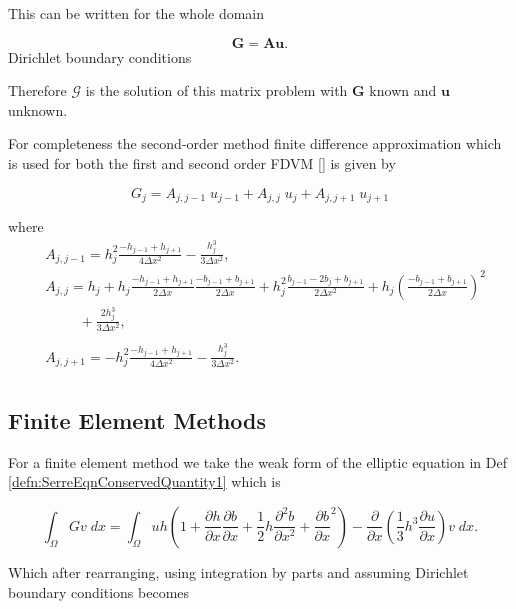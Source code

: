 This can be written for the whole domain 

\begin{equation*}
\boldsymbol{G} = \boldsymbol{A}
\boldsymbol{u}.
\end{equation*}
Dirichlet boundary conditions

Therefore $\mathcal{G}$ is the solution of this matrix problem with $\boldsymbol{G}$ known and $\boldsymbol{u}$ unknown. 

For completeness the second-order method finite difference approximation which is used for both the first and second order FDVM [] is given by

\begin{equation*}
G_j = A_{j,j-1} \; u_{j-1} + A_{j,j} \; u_{j} +  A_{j,j + 1} \;u_{j+1}
\end{equation*}

where 
\begin{align*}
&A_{j,j-1} = h^2_j\frac{-h_{j-1} + h_{j+1}}{4 \Delta x ^2} - \frac{h_{j}^3}{3 \Delta x ^2}, \\
&A_{j,j} = h_j + h_j \frac{-h_{j-1} + h_{j+1}}{2 \Delta x}\frac{-b_{j-1} + b_{j+1}}{2 \Delta x} + h_j^2\frac{b_{j-1} - 2b_j + b_{j+1}}{2 \Delta x^2} + h_j \left(\frac{-b_{j-1} + b_{j+1}}{2 \Delta x}\right)^2 \\
& \hspace{1cm}+ \frac{2 h_j^3}{3 \Delta x^2}, \\ \\
&A_{j,j+1} = -h^2_j\frac{-h_{j-1} + h_{j+1}}{4 \Delta x ^2} - \frac{h_{j}^3}{3 \Delta x ^2}. \\
\end{align*}

\subsection{Finite Element Methods}
For a finite element method we take the weak form of the elliptic equation in Def \ref{defn:SerreEqnConservedQuantity1} which is 

	\[ \int_{\Omega } G v \; dx =  \int_{\Omega } uh \left(1 + \frac{\partial h}{\partial x}\frac{\partial b}{\partial x} + \frac{1}{2}h\frac{\partial^2 b}{\partial x^2} + \frac{\partial b}{\partial x}^2 \right) - \frac{\partial}{\partial x}\left(\frac{1}{3}h^3  \frac{\partial {u}}{\partial x}\right) v \; dx.\]
	
Which after rearranging, using integration by parts and assuming Dirichlet boundary conditions becomes

